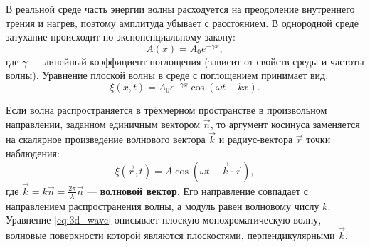 \begin{definition}
В реальной среде часть энергии волны расходуется на преодоление внутреннего трения и нагрев, поэтому амплитуда убывает с расстоянием. В однородной среде затухание происходит по экспоненциальному закону:
\begin{equation}
    A(x) = A_0 e^{-\gamma x},
\end{equation}
где $\gamma$ --- линейный коэффициент поглощения (зависит от свойств среды и частоты волны). Уравнение плоской волны в среде с поглощением принимает вид:
\begin{equation}
    \xi(x, t) = A_0 e^{-\gamma x} \cos(\omega t - kx). \label{eq:dissipative_wave}
\end{equation}
\end{definition}

\begin{definition}
Если волна распространяется в трёхмерном пространстве в произвольном направлении, заданном единичным вектором $\vec{n}$, то аргумент косинуса заменяется на скалярное произведение волнового вектора $\vec{k}$ и радиус-вектора $\vec{r}$ точки наблюдения:
\begin{equation}
    \xi(\vec{r}, t) = A \cos(\omega t - \vec{k} \cdot \vec{r}), \label{eq:3d_wave}
\end{equation}
где $\vec{k} = k \vec{n} = \frac{2\pi}{\lambda} \vec{n}$ --- \textbf{волновой вектор}. Его направление совпадает с направлением распространения волны, а модуль равен волновому числу $k$. Уравнение \eqref{eq:3d_wave} описывает плоскую монохроматическую волну, волновые поверхности которой являются плоскостями, перпендикулярными $\vec{k}$.
\end{definition}

